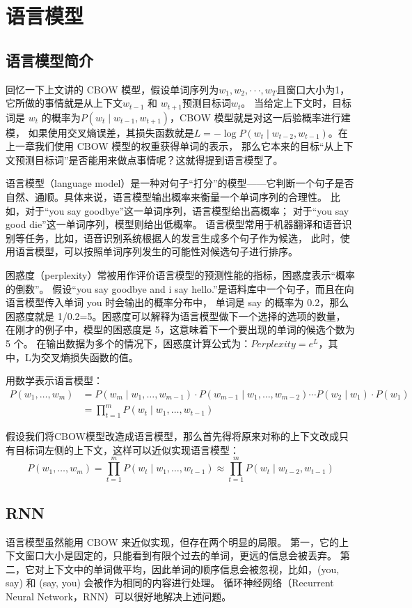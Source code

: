 \chapter{语言模型}
\section{语言模型简介}
回忆一下上文讲的 CBOW 模型，假设单词序列为$w_1, w_2, ··· , w_T$且窗口大小为1，
它所做的事情就是从上下文$w_{t−1}$ 和 $w_{t+1}$预测目标词$w_t$。
当给定上下文时，目标词是 $w_t$ 的概率为$P(w_t \mid w_{t-1}, w_{t+1})$，CBOW 模型就是对这一后验概率进行建模，
如果使用交叉熵误差，其损失函数就是$L = -\log P(w_t \mid w_{t-2}, w_{t-1})$。在上一章我们使用 CBOW 模型的权重获得单词的表示，
那么它本来的目标“从上下文预测目标词”是否能用来做点事情呢？这就得提到语言模型了。

语言模型（language model）是一种对句子“打分”的模型——它判断一个句子是否自然、通顺。具体来说，语言模型输出概率来衡量一个单词序列的合理性。
比如，对于“you say goodbye”这一单词序列，语言模型给出高概率；
对于“you say good die”这一单词序列，模型则给出低概率。
语言模型常用于机器翻译和语音识别等任务，比如，语音识别系统根据人的发言生成多个句子作为候选，
此时，使用语言模型，可以按照单词序列发生的可能性对候选句子进行排序。

困惑度（perplexity）常被用作评价语言模型的预测性能的指标，困惑度表示“概率的倒数”。
假设“you say goodbye and i say hello.”是语料库中一个句子，而且在向语言模型传入单词 you 时会输出的概率分布中，
单词是 say 的概率为 0.2，那么困惑度就是 1/0.2=5。困惑度可以解释为语言模型做下一个选择的选项的数量，
在刚才的例子中，模型的困惑度是 5，这意味着下一个要出现的单词的候选个数为 5 个。
在输出数据为多个的情况下，困惑度计算公式为：$Perplexity = e^L$，其中，L为交叉熵损失函数的值。

用数学表示语言模型：
\begin{align*}
	P(w_1, \dots, w_m) & = P(w_m \mid w_1, \dots, w_{m-1}) \cdot P(w_{m-1} \mid w_1, \dots, w_{m-2}) \cdots P(w_2 \mid w_1) \cdot P(w_1) \\
	                   & = \prod_{t=1}^{m} P(w_t \mid w_1, \dots, w_{t-1})
\end{align*}

假设我们将CBOW模型改造成语言模型，那么首先得将原来对称的上下文改成只有目标词左侧的上下文，这样可以近似实现语言模型：
$$
	P(w_1, \dots, w_m) = \prod_{t=1}^{m} P(w_t \mid w_1, \dots, w_{t-1}) \approx \prod_{t=1}^{m} P(w_t \mid w_{t-2}, w_{t-1})
$$


\section{RNN}
语言模型虽然能用 CBOW 来近似实现，但存在两个明显的局限。
第一，它的上下文窗口大小是固定的，只能看到有限个过去的单词，更远的信息会被丢弃。
第二，它对上下文中的单词做平均，因此单词的顺序信息会被忽视，比如，(you, say) 和 (say, you) 会被作为相同的内容进行处理。
循环神经网络（Recurrent Neural Network，RNN）可以很好地解决上述问题。

